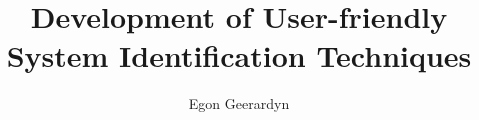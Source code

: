 \documentclass{memoir}
\title{Development of User-friendly System Identification Techniques}
\author{Egon Geerardyn}
\begin{document}
   \maketitle

   \tableofcontents
   \newpage
   \cite{Geerardyn2015TIM}


   

   
   
   
   
   
   
   
   

   
\end{document}
